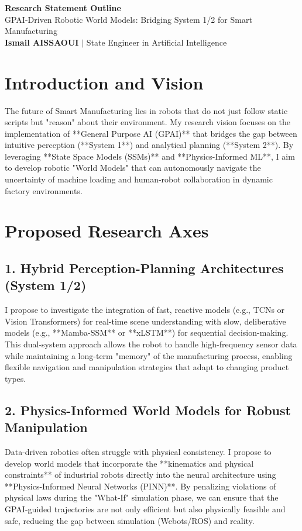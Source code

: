 \documentclass[11pt,a4paper]{article}
\begin{document}
\begin{center}
    {\LARGE\bfseries\color{bosch_red} Research Statement Outline}\\[6pt]
    {\large GPAI-Driven Robotic World Models: Bridging System 1/2 for Smart Manufacturing}\\[4pt]
    \textbf{Ismail AISSAOUI} $|$ State Engineer in Artificial Intelligence
\end{center}

\bigskip

\section{Introduction and Vision}
The future of Smart Manufacturing lies in robots that do not just follow static scripts but "reason" about their environment. My research vision focuses on the implementation of **General Purpose AI (GPAI)** that bridges the gap between intuitive perception (**System 1**) and analytical planning (**System 2**). By leveraging **State Space Models (SSMs)** and **Physics-Informed ML**, I aim to develop robotic "World Models" that can autonomously navigate the uncertainty of machine loading and human-robot collaboration in dynamic factory environments.

\section{Proposed Research Axes}

\subsection{1. Hybrid Perception-Planning Architectures (System 1/2)}
I propose to investigate the integration of fast, reactive models (e.g., TCNs or Vision Transformers) for real-time scene understanding with slow, deliberative models (e.g., **Mamba-SSM** or **xLSTM**) for sequential decision-making. This dual-system approach allows the robot to handle high-frequency sensor data while maintaining a long-term "memory" of the manufacturing process, enabling flexible navigation and manipulation strategies that adapt to changing product types.

\subsection{2. Physics-Informed World Models for Robust Manipulation}
Data-driven robotics often struggle with physical consistency. I propose to develop world models that incorporate the **kinematics and physical constraints** of industrial robots directly into the neural architecture using **Physics-Informed Neural Networks (PINN)**. By penalizing violations of physical laws during the "What-If" simulation phase, we can ensure that the GPAI-guided trajectories are not only efficient but also physically feasible and safe, reducing the gap between simulation (Webots/ROS) and reality.
\end{document}
